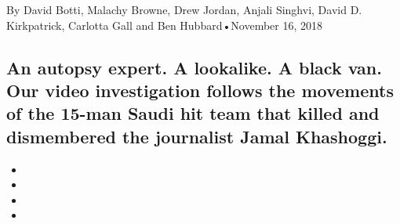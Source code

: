 By David Botti, Malachy Browne, Drew Jordan, Anjali Singhvi, David D.
Kirkpatrick, Carlotta Gall and Ben Hubbard•November 16, 2018

\hypertarget{an-autopsy-expert-a-lookalike-a-black-van-our-video-investigation-follows-the-movements-of-the-15-man-saudi-hit-team-that-killed-and-dismembered-the-journalist-jamal-khashoggi-1}{%
\subsection{An autopsy expert. A lookalike. A black van. Our video
investigation follows the movements of the 15-man Saudi hit team that
killed and dismembered the journalist Jamal
Khashoggi.}\label{an-autopsy-expert-a-lookalike-a-black-van-our-video-investigation-follows-the-movements-of-the-15-man-saudi-hit-team-that-killed-and-dismembered-the-journalist-jamal-khashoggi-1}}

\begin{itemize}
\item
\item
\item
\item
\end{itemize}

